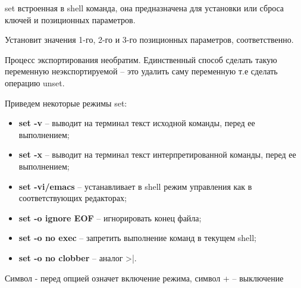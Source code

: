 \begin{defi}{set}
	встроенная в shell команда, она предназначена для установки или сброса ключей и позиционных параметров.
\end{defi}

Установит значения 1-го, 2-го и 3-го позиционных параметров, соответственно.

Процесс экспортирования необратим. Единственный способ сделать такую переменную неэкспортируемой -- это удалить саму переменную т.е сделать операцию unset.

Приведем некоторые режимы set:
\begin{itemize}
	\item \textbf{set -v} -- выводит на терминал текст исходной команды, перед ее выполнением;
	\item \textbf{set -x} -- выводит на терминал текст интерпретированной команды, перед ее выполнением;
	\item \textbf{set -vi/emacs} -- устанавливает в shell режим управления как в соответствующих редакторах;
	\item \textbf{set -o ignore EOF} -- игнорировать конец файла;
	\item \textbf{set -o no exec} -- запретить выполнение команд в текущем shell;
	\item \textbf{set -o no clobber} -- аналог >|.
\end{itemize}

\begin{important}
	Символ - перед опцией означет включение режима, символ + -- выключение
\end{important}
